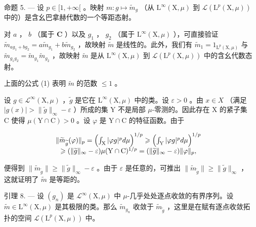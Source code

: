 命题 5. --- 设 \(p \in [1, +\infty[\) 。映射 \(m: g \mapsto \widetilde{m}_g\) （从 \(\mathrm{L}^{\infty}(\mathrm{X}, \mu)\) 到 \(\mathcal{L}(\mathrm{L}^{p}(\mathrm{X}, \mu))\) 中的）是含幺巴拿赫代数的一个等距态射。

对 \(a\) ， \(b\) （属于 \(\mathbf{C}\) ）以及 \(g_{1}\) ， \(g_{2}\) （属于 \(\mathrm{L}^{\infty}(\mathrm{X},\mu)\) ），可直接验证 \(\widetilde{m}_{ag_1+bg_2}=a\widetilde{m}_{g_1}+b\widetilde{m}_{g_2}\) ，故映射 \(\widetilde{m}\) 是线性的。此外，我们有 \(\widetilde{m}_{1}=1_{\mathrm{L}^{p}(\mathrm{X},\mu)}\) 与 \(\widetilde{m}_{g_{1}g_{2}}=\widetilde{m}_{g_{1}}\widetilde{m}_{g_{2}}\) ，故映射 \(\widetilde{m}\) 是从 \(\mathrm{L}^{\infty}(\mathrm{X},\mu)\) 到 \(\mathcal{L}(\mathrm{L}^{p}(\mathrm{X},\mu))\) 中的含幺代数态射。

上面的公式 (1) 表明 \(\widetilde{m}\) 的范数 \(\leqslant 1\) 。

设 \(g \in \mathcal{L}^{\infty}(\mathrm{X},\mu)\) ，\(\widetilde{g}\) 是它在 \(\mathrm{L}^{\infty}(\mathrm{X},\mu)\) 中的类。设 \(\varepsilon > 0\) 。由 \(x \in X\) （满足 \(|g(x)| > \| \widetilde{g}\|_{\infty} - \varepsilon\) ）所成的集 Y 不是局部 \(\mu\)-零测的。因此存在 X 的紧子集 C 使得 \(\mu (\mathrm{Y} \cap \mathrm{C}) > 0\) 。设 \(\varphi\) 是 \(\mathrm{Y} \cap \mathrm{C}\) 的特征函数。由于

\[
\begin{array}{c} \| \widetilde {m} _ {\widetilde {g}} (\varphi) \| _ {p} = \Bigl (\int_ {\mathrm{X}} | \varphi g | ^ {p}   d \mu \Bigr) ^ {1 / p} \geqslant \Bigl (\int_ {\mathrm{Y}} | \varphi g | ^ {p}   d \mu \Bigr) ^ {1 / p} \\ \geqslant (\| \widetilde {g} \| _ {\infty} - \varepsilon) \mu (\mathrm{Y} \cap \mathrm{C}) ^ {1 / p} = (\| \widetilde {g} \| _ {\infty} - \varepsilon) \| \varphi \| _ {p}, \end{array}
\]

便得到 \(\|\widetilde{m}_{\widetilde{g}}\|\geqslant\|\widetilde{g}\|_{\infty}-\varepsilon\) 。由于 \(\varepsilon\) 是任意的，可推出 \(\|\widetilde{m}_{\widetilde{g}}\|\geqslant\|\widetilde{g}\|_{\infty}\) ，这就证明了 \(\widetilde{m}\) 是等距的。

引理 8. --- 设 \((g_n)\) 是 \(\mathcal{L}^\infty(\mathrm{X},\mu)\) 中 \(\mu\)-几乎处处逐点收敛的有界序列。设 \(\widetilde{m} \in \mathrm{L}^\infty(\mathrm{X},\mu)\) 是其极限的类。那么 \(\widetilde{m}_{g_n}\) 收敛于 \(\widetilde{m}_{\widetilde{g}}\) ，这里是在赋有逐点收敛拓扑的空间 \(\mathcal{L}(\mathrm{L}^p(\mathrm{X},\mu))\) 中。

